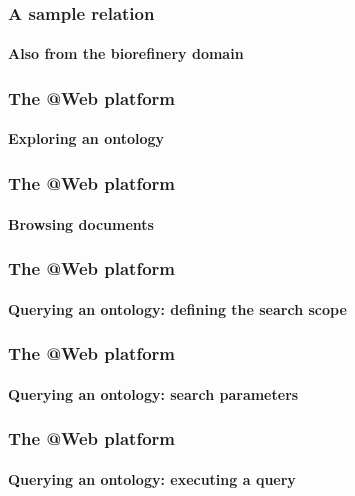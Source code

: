 \documentclass{beamer}
\begin{document}
\begin{frame}
  \frametitle{A sample relation}
  \framesubtitle{Also from the biorefinery domain}

  \begin{center}
  \end{center}
\end{frame}

\begin{frame}
  \frametitle{The \textbf{@Web} platform}
  \framesubtitle{Exploring an ontology}

  \begin{center}
  \end{center}
\end{frame}

\begin{frame}
  \frametitle{The \textbf{@Web} platform}
  \framesubtitle{Browsing documents}

  \begin{center}
  \end{center}
\end{frame}

\begin{frame}
  \frametitle{The \textbf{@Web} platform}
  \framesubtitle{Querying an ontology: defining the search scope}

  \begin{center}
  \end{center}
\end{frame}

\begin{frame}
  \frametitle{The \textbf{@Web} platform}
  \framesubtitle{Querying an ontology: search parameters}

  \begin{center}
  \end{center}
\end{frame}

\begin{frame}
  \frametitle{The \textbf{@Web} platform}
  \framesubtitle{Querying an ontology: executing a query}

  \begin{center}
  \end{center}
\end{frame}
\end{document}
